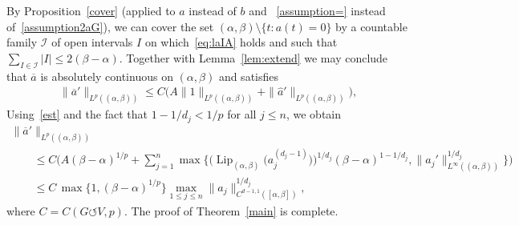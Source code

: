 \documentclass[11pt]{article}
\numberwithin{equation}{section}
\numberwithin{equation}{section}
\def\al{\alpha}
\def\be{\beta}
\def\cI{\mathcal{I}}
\def\ol{\overline}
\def\Lip{\on{Lip}}
\def\we{\hat}
\def\acts{\circlearrowleft}
\let\on=\operatorname
\begin{document}
 By Proposition~\ref{cover} (applied to $a$ instead of $b$ and
~\eqref{assumption=} instead of~\eqref{assumption2aG}),
 we can cover the set
 $(\al,\be) \setminus \{t \colon a(t) = 0\}$
by a countable family $\cI$ of open intervals $I$ on which~\eqref{eq:laIA} holds and such that
$\sum_{I \in \cI} |I| \le 2 (\be - \al)$.
Together with Lemma~\ref{lem:extend} we may conclude that
$\ol a$ is absolutely continuous on $(\al,\be)$ and satisfies
\begin{gather*}
 \|\ol a'\|_{L^p((\al,\be))} \le C \big(A \|1\|_{L^p((\al,\be))}
 + \|\we a'\|_{L^p ((\al,\be))}\big),
\end{gather*}
Using~\eqref{est} and the fact that $1 - 1/d_j < 1/p$ for all $j \le n$, we obtain
\begin{gather*}
 \|\ol a'\|_{L^p((\al,\be))}
 \\ \qquad
{} \le C \bigg(A (\be - \al)^{1/p}
+ \sum_{j=1}^n \max \big\{\big (\Lip_{(\al,\be)}\big( a_j^{(d_j-1)}\big)\big)^{1/d_j} (\be -\al)^{1-1/d_j}, \|a_j'\|^{1/d_j}_{L^\infty((\al,\be))}
 \big\} \bigg)
 \\ \qquad
{}\le C\, \max\big\{1, (\be-\al)^{1/p} \big\} \max_{1 \le j \le n} \|a_j\|^{1/d_j}_{C^{d-1,1}([\al, \be])},
\end{gather*}
where $C = C(G \acts V,p)$.
The proof of Theorem~\ref{main} is complete.
\end{document}
